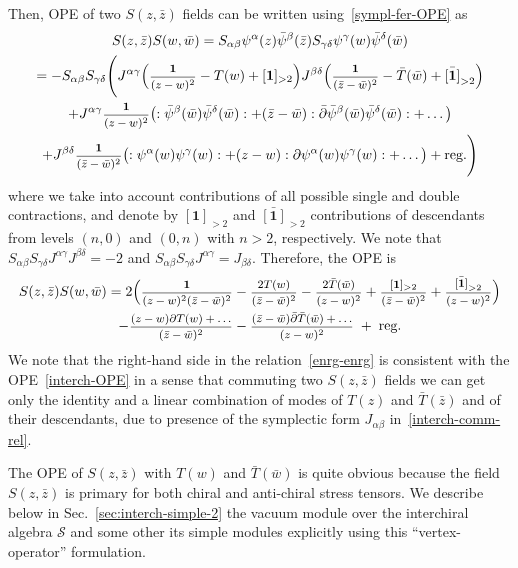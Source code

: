 \documentclass[11pt]{article}
\newcommand{\one}{\boldsymbol{1}}%
\newcommand{\twr}{[\one]_{>2}}
\newcommand{\btwr}{\bar{[\one]}_{>2}}
\newcommand{\ffrac}[2]{\mbox{\footnotesize$\displaystyle\frac{#1}{#2}$}}
\newcommand{\interchalg}{\mathcal{S}}
\newcommand{\bz}{\bar{z}}
\newcommand{\bw}{\bar{w}}
\newcommand{\der}{\partial}
\newcommand{\bder}{\bar{\partial}}
\newcommand{\enrg}{S}
\theoremstyle{definition}
\begin{document}
Then, OPE of two $\enrg(z,\bz)$ fields can be written using~\eqref{sympl-fer-OPE}  as
\begin{multline}
\enrg(z,\bz)\enrg(w,\bw) = S_{\alpha\beta}\psi^{\alpha}(z)\bar{\psi}^{\beta}(\bz)S_{\gamma\delta}\psi^{\gamma}(w)\bar{\psi}^{\delta}(\bw)\\
= -  S_{\alpha\beta}S_{\gamma\delta} \Biggl(J^{\alpha\gamma}\Bigl(\ffrac{\one}{(z-w)^2} - T(w) + \twr \Bigr)
J^{\beta\delta}\Bigl(\ffrac{\one}{(\bz-\bw)^2} - \bar{T}(\bw) + \btwr\Bigr) \\
+ J^{\alpha\gamma}\ffrac{\one}{(z-w)^2}\bigl(:\bar{\psi}^{\beta}(\bw)\bar{\psi}^{\delta}(\bw):
+(\bz-\bw):\bder\bar{\psi}^{\beta}(\bw)\bar{\psi}^{\delta}(\bw): + \dots \bigr)\\
+ J^{\beta\delta}\ffrac{\one}{(\bz-\bw)^2}\bigl(:\psi^{\alpha}(w)\psi^{\gamma}(w):
+(z-w):\der\psi^{\alpha}(w)\psi^{\gamma}(w): + \dots \bigr) + \text{reg.}
\Biggr)
\end{multline}
where we take into account contributions of all possible single and double contractions, and denote by $\twr$ and $\btwr$ contributions of descendants from levels $(n,0)$ and $(0,n)$ with $n>2$, respectively. We note that $ S_{\alpha\beta}S_{\gamma\delta}J^{\alpha\gamma}J^{\beta\delta} =-2$ and $ S_{\alpha\beta}S_{\gamma\delta}J^{\alpha\gamma}=J_{\beta\delta}$. Therefore, the OPE is
\begin{multline}\label{interch-OPE}
\enrg(z,\bz)\enrg(w,\bw) = 2 \Bigl(\ffrac{\one}{(z-w)^2(\bz-\bw)^2} - \ffrac{2T(w)}{(\bz-\bw)^2} - \ffrac{2\bar{T}(\bw)}{(z-w)^2}
+ \ffrac{\twr}{(\bz-\bw)^2} + \ffrac{\btwr}{(z-w)^2} \Bigr)\\
- \ffrac{(z-w)\der T(w)+\dots}{(\bz-\bw)^2}
- \ffrac{(\bz-\bw)\bder \bar{T}(\bw)+\dots}{(z-w)^2} \; + \; \text{reg.}
\end{multline}
We note that the right-hand side in the relation~\eqref{enrg-enrg} is consistent with the
OPE~\eqref{interch-OPE} in a sense that commuting two $\enrg(z,\bz)$
fields we can get only the identity and a linear combination of modes of
$T(z)$ and $\bar{T}(\bz)$ and of their descendants, due to presence of
the symplectic form $ J_{\alpha\beta}$ in~\eqref{interch-comm-rel}.

The OPE of $\enrg(z,\bz)$ with $T(w)$ and $\bar{T}(\bw)$ is quite
obvious because the field $\enrg(z,\bz)$ is primary for both chiral
and anti-chiral stress tensors.
We describe below in Sec.~\ref{sec:interch-simple-2} the vacuum
module over the interchiral algebra $\interchalg$ and some other its simple modules explicitly using this ``vertex-operator'' formulation.
\end{document}
